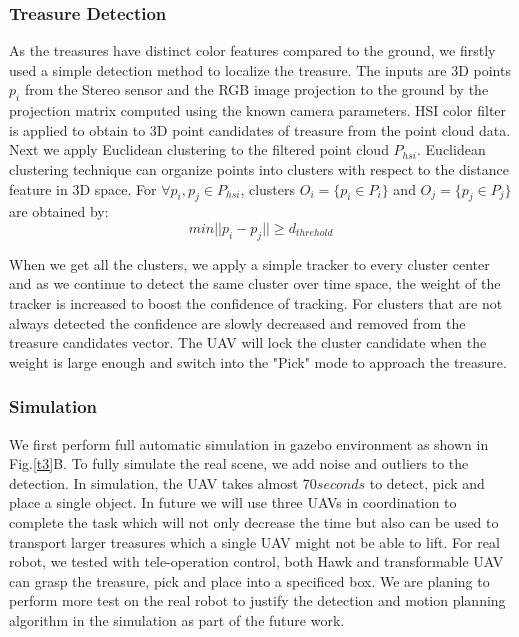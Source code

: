 \documentclass{standalone}
\begin{document}
\subsubsection{Treasure Detection}
As the treasures have distinct color features compared to the ground, we firstly used a simple detection method to localize the treasure. 
The inputs are 3D points $p_i$ from the Stereo sensor and the RGB image projection to the ground by the projection matrix computed using the known camera parameters. %
HSI color filter is applied to obtain to 3D point candidates of treasure from the point cloud data. Next we apply Euclidean clustering to the filtered point cloud $P_{hsi}$. Euclidean clustering technique can organize points into clusters with respect to the distance feature in 3D space. For $\forall p_i, p_j \in P_{hsi}$, clusters $O_i = \{p_i \in P_i\}$ and $O_j = \{p_j \in P_j\}$ are obtained by:
\begin{equation}\label{eq3-1}
min||p_i - p_j|| \geq d_{threhold} 
\end{equation}

When we get all the clusters, we apply a simple tracker to every cluster center and as we continue to detect the same cluster over time space, the weight of the tracker is increased to boost the confidence of tracking. For clusters that are not always detected the confidence are slowly decreased and removed from the treasure candidates vector. The UAV will lock the cluster candidate when the weight is large enough and switch into the "Pick" mode to approach the treasure.

\subsubsection{Simulation}
We first perform full automatic simulation in gazebo environment as shown in Fig.\ref{t3}B. To fully simulate the real scene, we add noise and outliers to the detection. In simulation, the UAV takes almost 70$seconds$ to detect, pick and place a single object. In future we will use three UAVs in coordination to complete the task which will not only decrease the time but also can be used to transport larger treasures which a single UAV might not be able to lift.
For real robot, we tested with tele-operation control, both Hawk and transformable UAV can grasp the treasure, pick and place into a specificed box. We are planing to perform more test on the real robot to justify the detection and motion planning algorithm in the simulation as part of the future work.
\end{document}
